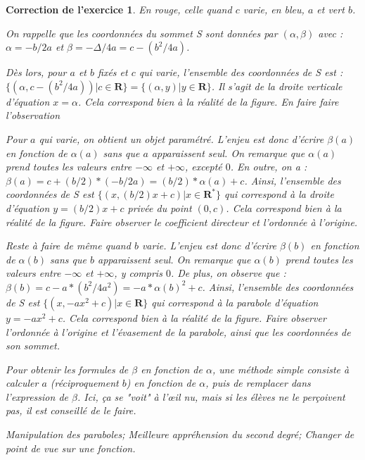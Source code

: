 \documentclass[12pt]{article}
\theoremstyle{break}
\newtheorem{cor}{Correction de l'exercice}
\begin{document}
\begin{cor}
En rouge, celle quand $c$ varie, en bleu, $a$ et vert $b$.

On rappelle que les coordonnées du sommet S sont données par $(\alpha, \beta)$ avec : $\alpha = -b/2 a$ et $\beta = -\Delta / 4 a = c - (b^2 / 4a)$.

Dès lors, pour $a$ et $b$ fixés et $c$ qui varie, l'ensemble des coordonnées de S est : $\lbrace (\alpha, c - (b^2/4a)) | c \in \textbf{R} \rbrace = \lbrace (\alpha, y) | y \in \textbf{R} \rbrace$. Il s'agit de la droite verticale d'équation $x = \alpha$. Cela correspond bien à la réalité de la figure. \textit{En faire faire l'observation}

Pour $a$ qui varie, on obtient un objet paramétré. L'enjeu est donc d'écrire $\beta(a)$ en fonction de $\alpha(a)$ sans que $a$ apparaissent seul. On remarque que $\alpha(a)$ prend toutes les valeurs entre $-\infty$ et $+\infty$, excepté $0$. En outre, on a : $\beta(a) = c + (b/2) * (-b/2a) = (b/2) * \alpha(a) + c$. Ainsi, l'ensemble des coordonnées de S est $\lbrace (x, (b/2) x + c) | x \in \textbf{R}^{*} \rbrace$ qui correspond à la droite d'équation $y = (b/2) x + c$ privée du point $(0, c)$. Cela correspond bien à la réalité de la figure. \textit{Faire observer le coefficient directeur et l'ordonnée à l'origine.}

Reste à faire de même quand $b$ varie. L'enjeu est donc d'écrire $\beta(b)$ en fonction de $\alpha(b)$ sans que $b$ apparaissent seul. On remarque que $\alpha(b)$ prend toutes les valeurs entre $-\infty$ et $+\infty$, y compris $0$. De plus, on observe que : $\beta(b) = c - a * (b^2/4a^2) = -a * \alpha(b)^2 + c$. Ainsi, l'ensemble des coordonnées de S est $\lbrace (x, -a x^2 + c) | x \in \textbf{R} \rbrace$ qui correspond à la parabole d'équation $y = -a x^2 + c$.  Cela correspond bien à la réalité de la figure. \textit{Faire observer l'ordonnée à l'origine et l'évasement de la parabole, ainsi que les coordonnées de son sommet.}

Pour obtenir les formules de $\beta$ en fonction de $\alpha$, une méthode simple consiste à calculer $a$ (réciproquement $b$) en fonction de $\alpha$, puis de remplacer dans l'expression de $\beta$. Ici, ça se "voit" à l’œil nu, mais si les élèves ne le perçoivent pas, il est conseillé de le faire.

\textit{Manipulation des paraboles; Meilleure appréhension du second degré; Changer de point de vue sur une fonction. }
\end{cor}
\end{document}
